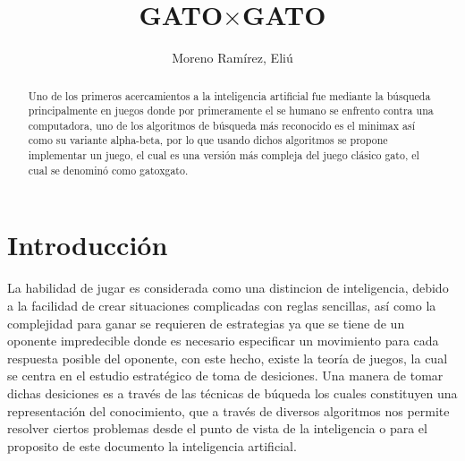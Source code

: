 \documentclass[runningheads]{llncs}
\begin{document}
%
\title{GATO$\times$GATO}
%
%
\author{Moreno Ramírez, Eliú}
%
%
%
\maketitle              %
%
\begin{abstract}
Uno de los primeros acercamientos a la inteligencia artificial fue mediante la búsqueda principalmente en juegos donde por primeramente el se humano se enfrento contra una computadora, uno de los algoritmos de búsqueda más reconocido es el minimax así como su variante alpha-beta, por lo que usando dichos algoritmos se propone implementar un juego, el cual es una versión más compleja del juego clásico gato, el cual se denominó como gatoxgato.

\end{abstract}
%
%
%
\section{Introducción}
La habilidad de jugar es considerada como una distincion de inteligencia, debido a la facilidad de crear situaciones complicadas con reglas sencillas, así como la complejidad para ganar se requieren de estrategias ya que se tiene de un oponente impredecible donde es necesario especificar un movimiento para cada respuesta posible del oponente, con este hecho, existe la teoría de juegos, la cual se centra en el estudio estratégico de toma de desiciones. Una manera de tomar dichas desiciones es a través de las técnicas de búqueda los cuales constituyen una representación del conocimiento, que a través de diversos algoritmos nos permite resolver ciertos problemas desde el punto de vista de la inteligencia o para el proposito de este documento la inteligencia artificial. 
\end{document}

